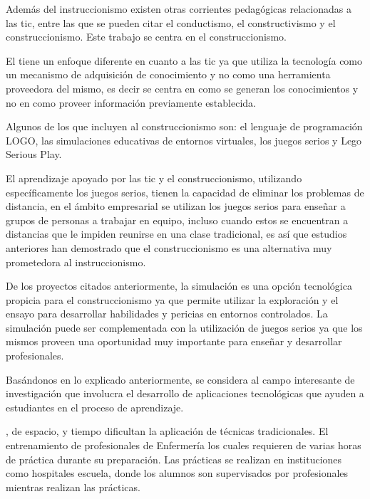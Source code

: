 Además del instruccionismo existen otras corrientes pedagógicas relacionadas a
las \Gls{tic}, entre las que se pueden citar el conductismo, el constructivismo
y el construccionismo. Este trabajo se centra en el construccionismo.

El  tiene un enfoque diferente en
cuanto a las \Gls{tic} ya que utiliza la tecnología como un mecanismo de
adquisición de conocimiento y no como una herramienta proveedora del
mismo\cite{sasha:construtivism}, es decir se centra en como se generan los
conocimientos y no en como proveer información previamente establecida. 

Algunos de los  que incluyen al construccionismo son: 
el lenguaje de programación LOGO, las simulaciones educativas de entornos virtuales, 
los juegos serios y Lego Serious Play.

El aprendizaje apoyado por las \Gls{tic} y el construccionismo, utilizando
específicamente los juegos serios, tienen la capacidad de eliminar los problemas
de distancia, en el ámbito empresarial se utilizan los juegos serios para
enseñar a grupos de personas a trabajar en equipo, incluso cuando estos se
encuentran a distancias que le impiden reunirse en una clase
tradicional\cite{mariluz:seiousgames}, es así que estudios anteriores han
demostrado que el construccionismo es una alternativa muy prometedora al
instruccionismo\cite{sasha:construtivism}.
   
De los proyectos citados anteriormente, la simulación es una opción tecnológica
propicia para el construccionismo ya que permite utilizar la exploración y el
ensayo para desarrollar habilidades y pericias en entornos
controlados\cite{humphreys2013developing}. La simulación puede ser complementada
con la utilización de juegos serios ya que los mismos proveen una oportunidad
muy importante para enseñar y desarrollar profesionales\cite{sg:aoverview}.

Basándonos en lo explicado anteriormente, se considera al campo interesante  de
investigación que involucra el desarrollo de aplicaciones tecnológicas que
ayuden a estudiantes en el proceso de aprendizaje. 

, de espacio, y tiempo dificultan
la aplicación de técnicas tradicionales. El entrenamiento
de profesionales de Enfermería los cuales requieren de varias horas de práctica
durante su preparación. Las prácticas se realizan en instituciones como hospitales
escuela, donde los alumnos son supervisados por profesionales mientras realizan
las prácticas.

